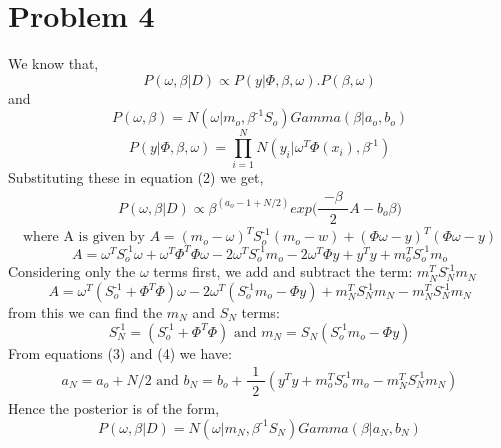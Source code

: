 \documentclass[11pt, a4paper, fleqn]{article}
\begin{document}
\section{Problem 4}
We know that,
\begin{equation}
P(\omega,\beta|D) \propto P(y|\Phi, \beta,\omega).P(\beta,\omega)
\end{equation}
and
\begin{equation*}
P(\omega,\beta) = N(\omega|m_o,\beta^\text{-1}S_o)Gamma(\beta|a_o,b_o)
\end{equation*}
\begin{equation*}
P(y|\Phi, \beta,\omega) = \prod_{i=1}^{N}{N(y_i|\omega^T \Phi(x_i) , \beta^\text{-1})}
\end{equation*}
Substituting these in equation (2) we get,
\begin{equation}
P(\omega,\beta|D) \propto \beta^\text{$(a_o - 1 + N/2)$} exp\Big(\frac{\substack{-\beta}}{\substack{2}}A - b_o\beta \Big)
\end{equation}
\begin{equation*}
\text{where A is given by } A = (m_o - \omega)^T S_o^\text{-1}(m_o -w) + (\Phi\omega -y)^T(\Phi\omega -y)
\end{equation*}
\begin{equation}
 A =  \omega^T S_o^\text{-1} \omega + \omega^T \Phi^T \Phi \omega -2\omega^T S_o^\text{-1} m_o  - 2\omega^T \Phi y + y^T y + m_o^T S_o^\text{-1} m_o
\end{equation}
Considering only the $\omega$ terms first, we add and subtract the term: $m_N^T S_N^\text{-1} m_N$
\begin{equation*}
 A =  \omega^T (S_o^\text{-1} + \Phi^T \Phi) \omega -2\omega^T (S_o^\text{-1} m_o  -  \Phi y) + m_N^T S_N^\text{-1} m_N - m_N^T S_N^\text{-1} m_N
\end{equation*}
from this we can find the $m_N$ and $S_N$ terms:
\begin{equation*}
S_N^\text{-1} = (S_o^\text{-1} + \Phi^T \Phi) \text{  and  } m_N = S_N (S_o^\text{-1} m_o  -  \Phi y)
\end{equation*}
From equations (3) and (4) we have:
\begin{equation*}
a_N = a_o + N/2 \text{  and  } b_N = b_o + \frac{\substack{1}}{\substack{2}} (y^T y + m_o^T S_o^\text{-1} m_o - m_N^T S_N^\text{-1} m_N )
\end{equation*}
Hence the posterior is of the form,
\begin{equation*}
P(\omega,\beta|D) = N(\omega|m_N,\beta^\text{-1}S_N)Gamma(\beta|a_N,b_N)
\end{equation*}
\end{document}
